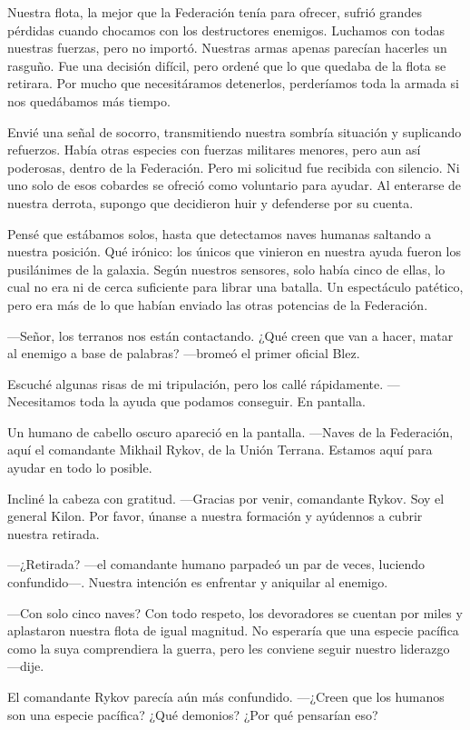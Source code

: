 Nuestra flota, la mejor que la Federación tenía para ofrecer, sufrió grandes pérdidas cuando chocamos con los destructores enemigos. Luchamos con todas nuestras fuerzas, pero no importó. Nuestras armas apenas parecían hacerles un rasguño. Fue una decisión difícil, pero ordené que lo que quedaba de la flota se retirara. Por mucho que necesitáramos detenerlos, perderíamos toda la armada si nos quedábamos más tiempo.

Envié una señal de socorro, transmitiendo nuestra sombría situación y suplicando refuerzos. Había otras especies con fuerzas militares menores, pero aun así poderosas, dentro de la Federación. Pero mi solicitud fue recibida con silencio. Ni uno solo de esos cobardes se ofreció como voluntario para ayudar. Al enterarse de nuestra derrota, supongo que decidieron huir y defenderse por su cuenta.

Pensé que estábamos solos, hasta que detectamos naves humanas saltando a nuestra posición. Qué irónico: los únicos que vinieron en nuestra ayuda fueron los pusilánimes de la galaxia. Según nuestros sensores, solo había cinco de ellas, lo cual no era ni de cerca suficiente para librar una batalla. Un espectáculo patético, pero era más de lo que habían enviado las otras potencias de la Federación.

—Señor, los terranos nos están contactando. ¿Qué creen que van a hacer, matar al enemigo a base de palabras? —bromeó el primer oficial Blez.

Escuché algunas risas de mi tripulación, pero los callé rápidamente. —Necesitamos toda la ayuda que podamos conseguir. En pantalla.

Un humano de cabello oscuro apareció en la pantalla. —Naves de la Federación, aquí el comandante Mikhail Rykov, de la Unión Terrana. Estamos aquí para ayudar en todo lo posible.

Incliné la cabeza con gratitud. —Gracias por venir, comandante Rykov. Soy el general Kilon. Por favor, únanse a nuestra formación y ayúdennos a cubrir nuestra retirada.

 —¿Retirada? —el comandante humano parpadeó un par de veces, luciendo confundido—. Nuestra intención es enfrentar y aniquilar al enemigo.

—Con solo cinco naves? Con todo respeto, los devoradores se cuentan por miles y aplastaron nuestra flota de igual magnitud. No esperaría que una especie pacífica como la suya comprendiera la guerra, pero les conviene seguir nuestro liderazgo —dije.

El comandante Rykov parecía aún más confundido. —¿Creen que los humanos son una especie pacífica? ¿Qué demonios? ¿Por qué pensarían eso?

